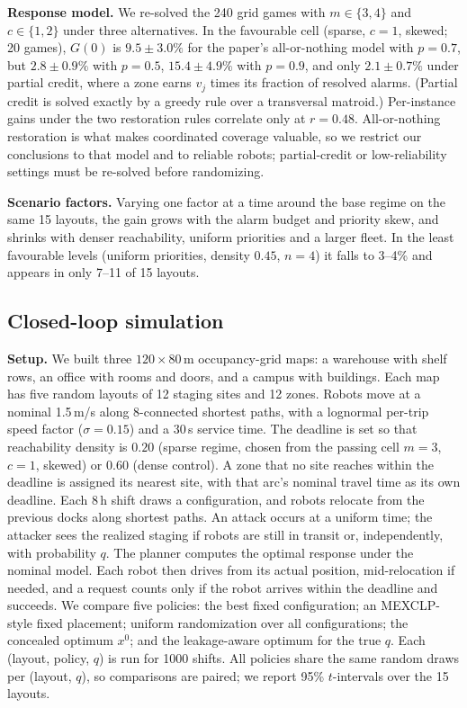 \documentclass[letterpaper,journal]{IEEEtran}
\theoremstyle{remark}
\begin{document}
\textbf{Response model.} We re-solved the 240 grid games with $m\in\{3,4\}$ and $c\in\{1,2\}$ under three alternatives. In the favourable cell (sparse, $c=1$, skewed; 20 games), $G(0)$ is $9.5\pm3.0\%$ for the paper's all-or-nothing model with $p=0.7$, but $2.8\pm0.9\%$ with $p=0.5$, $15.4\pm4.9\%$ with $p=0.9$, and only $2.1\pm0.7\%$ under partial credit, where a zone earns $v_j$ times its fraction of resolved alarms. (Partial credit is solved exactly by a greedy rule over a transversal matroid.) Per-instance gains under the two restoration rules correlate only at $r=0.48$. All-or-nothing restoration is what makes coordinated coverage valuable, so we restrict our conclusions to that model and to reliable robots; partial-credit or low-reliability settings must be re-solved before randomizing.

\textbf{Scenario factors.} Varying one factor at a time around the base regime on the same 15 layouts, the gain grows with the alarm budget and priority skew, and shrinks with denser reachability, uniform priorities and a larger fleet. In the least favourable levels (uniform priorities, density $0.45$, $n=4$) it falls to 3--4\% and appears in only 7--11 of 15 layouts.



\subsection{Closed-loop simulation}
\textbf{Setup.} We built three $120\times80$\,m occupancy-grid maps: a warehouse with shelf rows, an office with rooms and doors, and a campus with buildings. Each map has five random layouts of 12 staging sites and 12 zones. Robots move at a nominal 1.5\,m/s along 8-connected shortest paths, with a lognormal per-trip speed factor ($\sigma=0.15$) and a 30\,s service time. The deadline is set so that reachability density is $0.20$ (sparse regime, chosen from the passing cell $m=3$, $c=1$, skewed) or $0.60$ (dense control). A zone that no site reaches within the deadline is assigned its nearest site, with that arc's nominal travel time as its own deadline. Each 8\,h shift draws a configuration, and robots relocate from the previous docks along shortest paths. An attack occurs at a uniform time; the attacker sees the realized staging if robots are still in transit or, independently, with probability $q$. The planner computes the optimal response under the nominal model. Each robot then drives from its actual position, mid-relocation if needed, and a request counts only if the robot arrives within the deadline and succeeds. We compare five policies: the best fixed configuration; an MEXCLP-style fixed placement; uniform randomization over all configurations; the concealed optimum $x^0$; and the leakage-aware optimum for the true $q$. Each (layout, policy, $q$) is run for 1000 shifts. All policies share the same random draws per (layout, $q$), so comparisons are paired; we report 95\% $t$-intervals over the 15 layouts.
\end{document}

